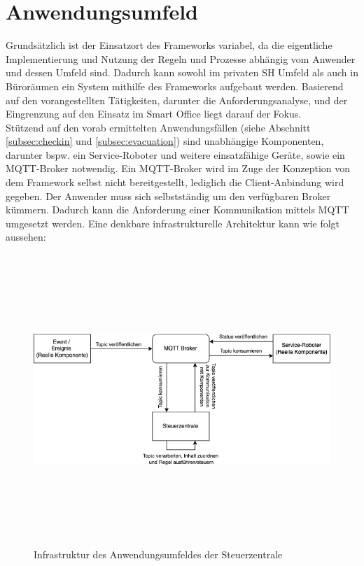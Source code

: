 \section{Anwendungsumfeld}
\label{sec:anwendungsumfeld}
    Grundsätzlich ist der Einsatzort des Frameworks variabel, da die eigentliche Implementierung und Nutzung der Regeln und Prozesse 
    abhängig vom Anwender und dessen Umfeld sind. Dadurch kann sowohl im privaten \acl{SH} Umfeld als auch in Büroräumen ein System mithilfe des 
    Frameworks aufgebaut werden. Basierend auf den vorangestellten Tätigkeiten, darunter die Anforderungsanalyse, und der Eingrenzung auf den 
    Einsatz im Smart Office liegt darauf der Fokus. %
    \\
    \linebreak
    Stützend auf den vorab ermittelten Anwendungsfällen (siehe Abschnitt \ref{subsec:checkin} und \ref{subsec:evacuation}) sind unabhängige 
    Komponenten, darunter bspw. ein Service-Roboter und weitere einsatzfähige Geräte, sowie ein \acs{MQTT}-Broker notwendig. Ein \acs{MQTT}-Broker 
    wird im Zuge der Konzeption von dem Framework selbst nicht bereitgestellt, lediglich die Client-Anbindung wird gegeben. Der Anwender muss sich selbstständig um den verfügbaren Broker kümmern. 
    Dadurch kann die Anforderung einer Kommunikation mittels \acs{MQTT} umgesetzt werden. Eine denkbare infrastrukturelle 
    Architektur kann wie folgt aussehen: 
    \begin{figure}[hbt!]
        \centering
        \includegraphics[width=14cm,height=11cm,keepaspectratio]{images/Systemarchitektur.png}
        \caption{Infrastruktur des Anwendungsumfeldes der Steuerzentrale}
        \label{fig:infrastructure}
    \end{figure}

